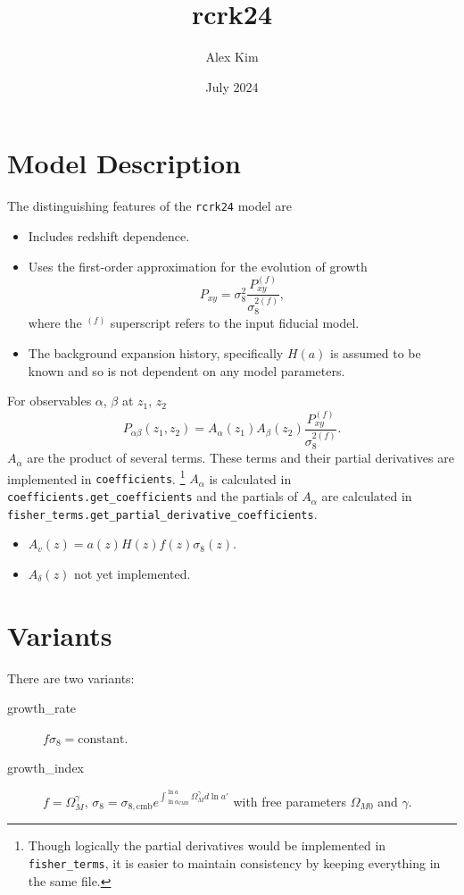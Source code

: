 \documentclass{article}
\title{rcrk24}
\author{Alex Kim}
\date{July 2024}
\begin{document}
 \maketitle

\section{Model Description}
The distinguishing features of the {\tt rcrk24} model are
\begin{itemize}
\item Includes redshift dependence.
\item Uses the first-order approximation for the evolution of growth
\begin{equation}
{P_{xy}} = {\sigma^2_8} \frac{P^{(f)}_{xy}}{\sigma^{2(f)}_8},
\end{equation}
where the ${}^{(f)}$ superscript refers to the input fiducial model.
\item
The background expansion history, specifically $H(a)$ is assumed to be known and so is not dependent
on any model parameters.
\end{itemize}

For observables $\alpha$, $\beta$ at $z_1$, $z_2$
\begin{equation}
P_{\alpha\beta}(z_1,z_2)= A_\alpha(z_1) A_\beta(z_2) \frac{P^{(f)}_{xy}}{\sigma^{2(f)}_8}.
\end{equation}
$A_\alpha$ are the product of several terms.
These terms and their partial derivatives are implemented in {\tt coefficients}.
\footnote{Though logically the partial derivatives would be implemented in
{\tt fisher\_terms}, it is easier to maintain consistency by keeping everything in the same file.}
$A_\alpha$ is calculated in {\tt coefficients.get\_coefficients} and the partials
of $A_\alpha$ are calculated in {\tt fisher\_terms.get\_partial\_derivative\_coefficients}.

\begin{itemize}
\item $A_v(z) = a(z)H(z)f(z)\sigma_8(z)$.
\item $A_\delta(z)$ not yet implemented.
\end{itemize}
\section{Variants}

There are two variants:
\begin{description}
\item[growth\_rate] $f\sigma_8=\text{constant}$.
\item[growth\_index] $f=\Omega_{M}^\gamma$, $\sigma_8  = \sigma_{8,\text{cmb}}  e^{\int^{\ln{a}}_{\ln{a_\text{CMB}}} \Omega_M^\gamma d\ln{a'}} $ with free parameters $\Omega_{M0}$ and $\gamma$.
\end{description}
\end{document}
